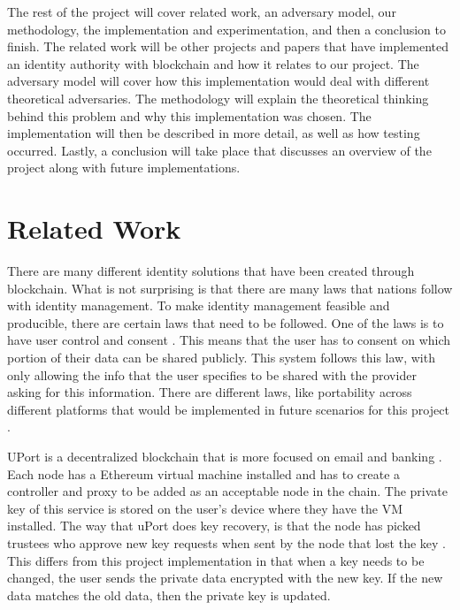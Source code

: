 \documentclass[letterpaper, 10 pt, conference]{ieeeconf}  %
\begin{document}
The rest of the project will cover related work, an adversary model, our methodology, the implementation and experimentation, and then a conclusion to finish. The related work will be other projects and papers that have implemented an identity authority with blockchain and how it relates to our project. The adversary model will cover how this implementation would deal with different theoretical adversaries. The methodology will explain the theoretical thinking behind this problem and why this implementation was chosen. The implementation will then be described in more detail, as well as how testing occurred. Lastly, a conclusion will take place that discusses an overview of the project along with future implementations.

\section{Related Work}

There are many different identity solutions that have been created through blockchain. What is not surprising is that there are many laws that nations follow with identity management. To make identity management feasible and producible, there are certain laws that need to be followed. One of the laws is to have user control and consent \cite{1}. This means that the user has to consent on which portion of their data can be shared publicly. This system follows this law, with only allowing the info that the user specifies to be shared with the provider asking for this information. There are different laws, like portability across different platforms that would be implemented in future scenarios for this project \cite{1}.

UPort is a decentralized blockchain that is more focused on email and banking \cite{1}. Each node has a Ethereum virtual machine installed and has to create a controller and proxy to be added as an acceptable node in the chain. The private key of this service is stored on the user's device where they have the VM installed. The way that uPort does key recovery, is that the node has picked trustees who approve new key requests when sent by the node that lost the key \cite{1}. This differs from this project implementation in that when a key needs to be changed, the user sends the private data encrypted with the new key. If the new data matches the old data, then the private key is updated.
\end{document}
